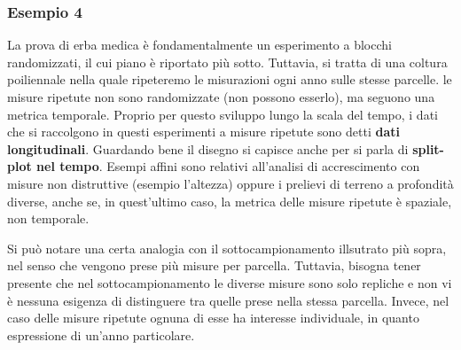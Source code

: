 \documentclass[a4paper,12pt,oneside]{book}
\begin{document}
\subsubsection{Esempio 4}\label{esempio-4-1}

La prova di erba medica è fondamentalmente un esperimento a blocchi
randomizzati, il cui piano è riportato più sotto. Tuttavia, si tratta di
una coltura poiliennale nella quale ripeteremo le misurazioni ogni anno
sulle stesse parcelle. le misure ripetute non sono randomizzate (non
possono esserlo), ma seguono una metrica temporale. Proprio per questo
sviluppo lungo la scala del tempo, i dati che si raccolgono in questi
esperimenti a misure ripetute sono detti \textbf{dati longitudinali}.
Guardando bene il disegno si capisce anche per si parla di
\textbf{split-plot nel tempo}. Esempi affini sono relativi all'analisi
di accrescimento con misure non distruttive (esempio l'altezza) oppure i
prelievi di terreno a profondità diverse, anche se, in quest'ultimo
caso, la metrica delle misure ripetute è spaziale, non temporale.

Si può notare una certa analogia con il sottocampionamento illsutrato
più sopra, nel senso che vengono prese più misure per parcella.
Tuttavia, bisogna tener presente che nel sottocampionamento le diverse
misure sono solo repliche e non vi è nessuna esigenza di distinguere tra
quelle prese nella stessa parcella. Invece, nel caso delle misure
ripetute ognuna di esse ha interesse individuale, in quanto espressione
di un'anno particolare.
\end{document}
